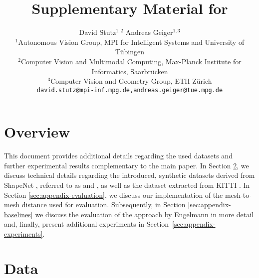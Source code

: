 \documentclass[10pt,letterpaper]{article}
\begin{document}
	
\title{Supplementary Material for\\}
\author{David Stutz$^{1,2}$ \qquad Andreas Geiger$^{1,3}$\\
	$^1$Autonomous Vision Group, MPI for Intelligent Systems and University of Tübingen\\
	$^2$Computer Vision and Multimodal Computing, Max-Planck Institute for Informatics, Saarbr\"{u}cken\\
	$^3$Computer Vision and Geometry Group, ETH Z\"{u}rich\\
	{\tt\small david.stutz@mpi-inf.mpg.de,andreas.geiger@tue.mpg.de}	
}

\clearpage\maketitle

\section{Overview}
\label{sec:appendix-overview}

This document provides additional details regarding the used datasets and further experimental results complementary to the main paper. In Section \ref{sec:appendix-data}, we discuss technical details regarding the introduced, synthetic datasets derived from ShapeNet \cite{Chang2015ARXIV}, referred to as \clean and \noisy,  as well as the dataset extracted from KITTI \cite{Geiger2012CVPR}.  In Section \ref{sec:appendix-evaluation}, we discuss our implementation of the mesh-to-mesh distance used for evaluation. Subsequently, in Section \ref{sec:appendix-baselines} we discuss the evaluation of the approach by Engelmann \etal \cite{Engelmann2016GCPR} in more detail and, finally, present additional experiments in Section~\ref{sec:appendix-experiments}.

\section{Data}
\label{sec:appendix-data}
\end{document}
